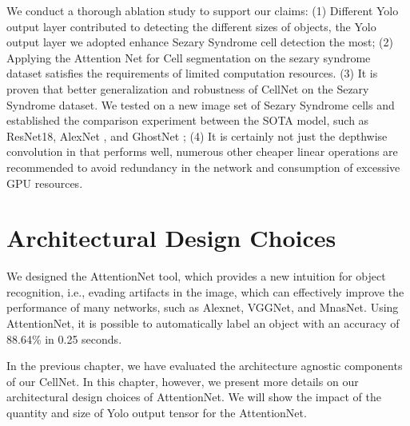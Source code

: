 We conduct a thorough ablation study to support our claims: (1)  Different Yolo output layer contributed to detecting the different sizes of objects, the Yolo output layer we adopted enhance Sezary Syndrome cell detection the most; (2) Applying the Attention Net for Cell segmentation on the sezary syndrome dataset satisfies the requirements of limited computation resources. 
(3) It is proven that better generalization and robustness of CellNet on the Sezary Syndrome dataset. We tested on a new image set of Sezary Syndrome cells and established the comparison experiment between the SOTA model, such as ResNet18\cite{20}, AlexNet \cite{31}, and GhostNet \cite{19}; (4) It is certainly not just the depthwise convolution in \cite{19} that performs well, numerous other cheaper linear operations are recommended to avoid redundancy in the network and consumption of excessive GPU resources.


\section{Architectural Design Choices}
\label{sec:lorem}

We designed the AttentionNet tool, which provides a new intuition for object recognition, i.e., evading artifacts in the image, which can effectively improve the performance of many networks, such as Alexnet\cite{31}, VGGNet\cite{23}, and MnasNet\cite{39}. Using AttentionNet, it is possible to automatically label an object with an accuracy of 88.64\% in 0.25 seconds. 

In the previous chapter, we have evaluated the architecture agnostic components of our CellNet. In this chapter, however, we present more details on our architectural design choices of AttentionNet. We will show the impact of the quantity and size of Yolo output tensor for the AttentionNet.

